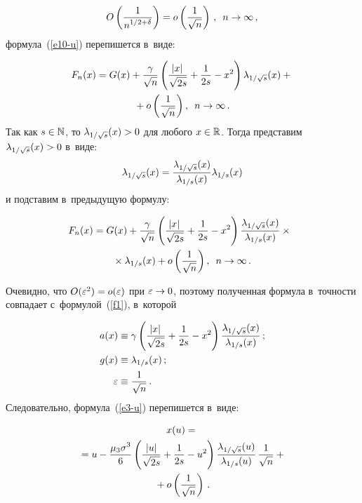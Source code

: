 \begin{multicols}{2}
 \noindent
$$
O\left(\fr{1}{n^{1/2+\delta}}\right) = o\left(\fr{1}{\sqrt{n}}\right)\,,\enskip
  n\rightarrow\infty\,,
  $$
формула~(\ref{e10-u}) перепишется в~виде: 

\noindent
\begin{multline*}
F_{n}(x)=G(x)+\fr{\gamma}{\sqrt{n}}\left( 
\fr{\left|x\right|}{\sqrt{2s}}+\fr{1}{2s}-x^2\right)
\lambda_{1/\sqrt{s}}(x)+{}\\
{}+o\left(\fr{1}{\sqrt{n}}\right),\enskip
n\rightarrow\infty\,. 
\end{multline*}
Так как $s \hm\in \mathbb{N}$, то $\lambda_{1/\sqrt{s}}(x)\hm>0$ 
для любого $x\hm\in\mathbb{R}$. Тогда представим $\lambda_{1/\sqrt{s}}(x)\hm>0$ 
в~виде:  
$$ 
\lambda_{1/\sqrt{s}}(x) = 
\fr{\lambda_{1/\sqrt{s}}(x)}{\lambda_{1/s}(x)}\lambda_{1/s}(x)  
$$
и подставим в~предыдущую формулу: 

\noindent
\begin{multline*}
\!\!F_{n}(x)=G(x)+\fr{\gamma}{\sqrt{n}}\left( 
\fr{\left|x\right|}{\sqrt{2s}}+\fr{1}{2s}-x^2\right)
\fr{\lambda_{1/\sqrt{s}}(x)}{\lambda_{1/s}(x)} \times {}\\
{} \times\lambda_{1/s}(x)+o\left(\fr{1}{\sqrt{n}}\right),\enskip n\rightarrow\infty\,. 
\end{multline*}

\vspace*{-12pt}

\pagebreak

\noindent
Очевидно, что $O(\varepsilon^2)\hm=o(\varepsilon)$ при $\varepsilon\hm\rightarrow 0$, 
поэтому полученная формула в~точности совпадает 
с~формулой~(\ref{f1}), в~которой 

\noindent
\begin{align*}
a(x) &\equiv \gamma\left( \fr{\left|x\right|}{\sqrt{2s}}+
\fr{1}{2s}-x^2\right)\fr{\lambda_{1/\sqrt{s}}(x)}{\lambda_{1/s}(x)}\,;\\
 g(x) &\equiv \lambda_{1/s}(x)\,; \\
\varepsilon &\equiv \fr{1}{\sqrt{n}}\,. 
\end{align*}
Следовательно, формула~(\ref{e3-u}) перепишется в~виде:  

\noindent
\begin{multline*}
x(u)={}\\
{}=u-\fr{\mu_{3}\sigma^{3}}{6}\left(\fr{|u|}{\sqrt{2s}} +
\fr{1}{2s}-u^{2}\right)  
\fr{\lambda_{1/\sqrt{s}}(u)}{\lambda_{1/s}(u)}\, \fr{1}{\sqrt{n}} + {}\\
{}+
o\left(\fr{1}{\sqrt{n}}\right)\,.
\end{multline*}


\end{multicols}
